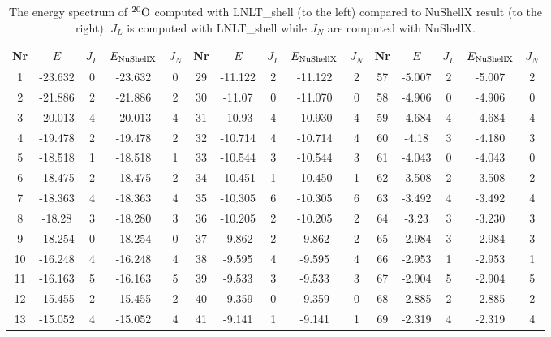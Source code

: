 \begin{table}[h]
\caption{The energy spectrum of $^{20}\rm{O}$ computed with LNLT\_shell (to the left) compared to NuShellX result (to the right). \(J_L\) is computed with LNLT\_shell while \(J_N\) are computed with NuShellX.}
\label{tab:ox20}
\begin{tabular}{c|cc|cc||c|cc|cc||c|cc|cc}
\hline Nr & \(E\) & \(J_{L}\) & \(E_{\rm{NuShellX}}\) & \(J_{N}\) & Nr & \(E\) & \(J_{L}\) & \(E_{\rm{NuShellX}}\) & \(J_{N}\) & Nr & \(E\) & \(J_{L}\) & \(E_{\rm{NuShellX}}\) & \(J_{N}\) \\
\hline 1   & -23.632 &       0 & -23.632 & 0 & 29  & -11.122 &       2 & -11.122 & 2 & 57  &  -5.007 &       2 & -5.007 & 2 \\
 2   & -21.886 &       2 & -21.886 & 2 & 30  &  -11.07 &       0 & -11.070 & 0 & 58  &  -4.906 &       0 & -4.906 & 0 \\
 3   & -20.013 &       4 & -20.013 & 4 & 31  &  -10.93 &       4 & -10.930 & 4 & 59  &  -4.684 &       4 & -4.684 & 4 \\
 4   & -19.478 &       2 & -19.478 & 2 & 32  & -10.714 &       4 & -10.714 & 4 & 60  &   -4.18 &       3 & -4.180 & 3 \\
 5   & -18.518 &       1 & -18.518 & 1 & 33  & -10.544 &       3 & -10.544 & 3 & 61  &  -4.043 &       0 & -4.043 & 0 \\
 6   & -18.475 &       2 & -18.475 & 2 & 34  & -10.451 &       1 & -10.450 & 1 & 62  &  -3.508 &       2 & -3.508 & 2 \\
 7   & -18.363 &       4 & -18.363 & 4 & 35  & -10.305 &       6 & -10.305 & 6 & 63  &  -3.492 &       4 & -3.492 & 4 \\
 8   &  -18.28 &       3 & -18.280 & 3 & 36  & -10.205 &       2 & -10.205 & 2 & 64  &   -3.23 &       3 & -3.230 & 3 \\
 9   & -18.254 &       0 & -18.254 & 0 & 37  &  -9.862 &       2 & -9.862 & 2 & 65  &  -2.984 &       3 & -2.984 & 3 \\
 10  & -16.248 &       4 & -16.248 & 4 & 38  &  -9.595 &       4 & -9.595 & 4 & 66  &  -2.953 &       1 & -2.953 & 1 \\
 11  & -16.163 &       5 & -16.163 & 5 & 39  &  -9.533 &       3 & -9.533 & 3 & 67  &  -2.904 &       5 & -2.904 & 5 \\
 12  & -15.455 &       2 & -15.455 & 2 & 40  &  -9.359 &       0 & -9.359 & 0 & 68  &  -2.885 &       2 & -2.885 & 2 \\
 13  & -15.052 &       4 & -15.052 & 4 & 41  &  -9.141 &       1 & -9.141 & 1 & 69  &  -2.319 &       4 & -2.319 & 4 \\

\end{tabular}
\end{table}
